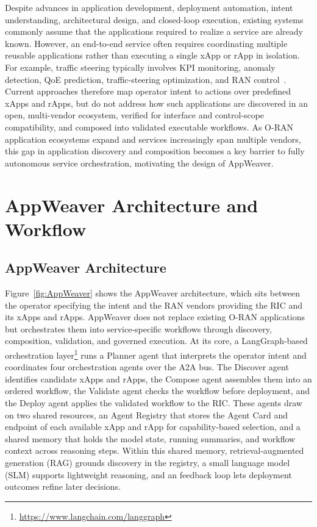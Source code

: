 \documentclass[conference]{IEEEtran}
\begin{document}
Despite advances in application development, deployment automation, intent understanding, architectural design, and closed-loop execution, existing systems commonly assume that the applications required to realize a service are already known. However, an end-to-end service often requires coordinating multiple reusable applications rather than executing a single xApp or rApp in isolation. For example, traffic steering typically involves KPI monitoring, anomaly detection, QoE prediction, traffic-steering optimization, and RAN control~\cite{yang2024agile}. Current approaches therefore map operator intent to actions over predefined xApps and rApps, but do not address how such applications are discovered in an open, multi-vendor ecosystem, verified for interface and control-scope compatibility, and composed into validated executable workflows. As O-RAN application ecosystems expand and services increasingly span multiple vendors, this gap in application discovery and composition becomes a key barrier to fully autonomous service orchestration, motivating the design of AppWeaver.



\section{AppWeaver Architecture and Workflow}\label{sec:architecture}
\subsection{AppWeaver Architecture} 
Figure~\ref{fig:AppWeaver} shows the AppWeaver architecture, which sits between the operator specifying the intent and the RAN vendors providing the RIC and its xApps and rApps. AppWeaver does not replace existing O-RAN applications but orchestrates them into service-specific workflows through discovery, composition, validation, and governed execution. At its core, a LangGraph-based orchestration layer\footnote{\url{https://www.langchain.com/langgraph}} runs a Planner agent that interprets the operator intent and coordinates four orchestration agents over the A2A bus. The Discover agent identifies candidate xApps and rApps, the Compose agent assembles them into an ordered workflow, the Validate agent checks the workflow before deployment, and the Deploy agent applies the validated workflow to the RIC. These agents draw on two shared resources, an Agent Registry that stores the Agent Card and endpoint of each available xApp and rApp for capability-based selection, and a shared memory that holds the model state, running summaries, and workflow context across reasoning steps. Within this shared memory, retrieval-augmented generation (RAG) grounds discovery in the registry, a small language model (SLM) supports lightweight reasoning, and an feedback loop lets deployment outcomes refine later decisions.
\end{document}

